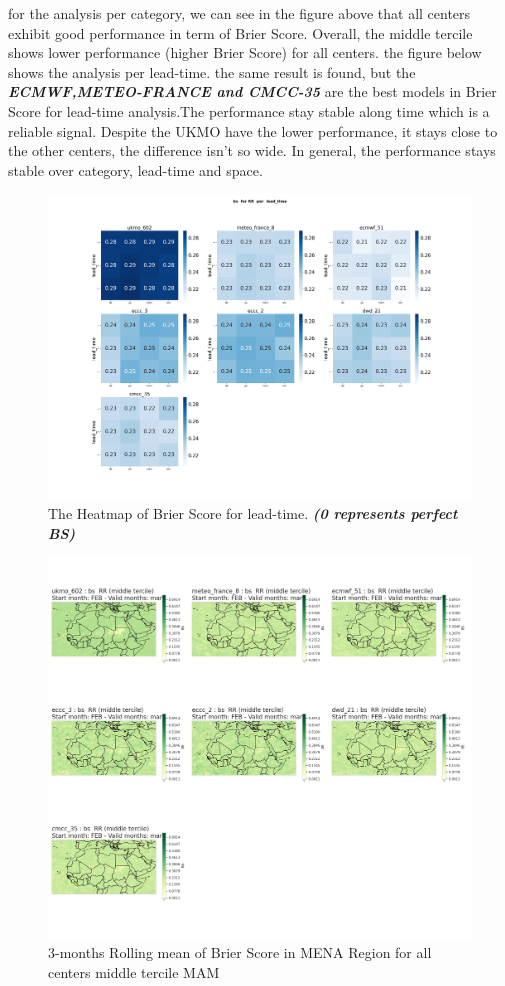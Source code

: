 for the analysis per category, we can see in the figure above that all centers exhibit good performance in term of Brier Score. Overall, the middle tercile shows lower performance (higher Brier Score) for all centers. 
the figure below shows the analysis per lead-time. the same result is found, but the \textbf{\textit{ECMWF,METEO-FRANCE and CMCC-35}} are the best models in Brier Score for lead-time analysis.The performance stay stable along time which is a reliable signal. Despite the UKMO have the lower performance, it stays close to the other centers, the difference isn't so wide. 
In general, the performance stays stable over category, lead-time and space.


\begin{figure}[H]
    \centering
    \includegraphics[scale=0.25]{plots/prob/bs/bs_RR_lead_time.png}
    \caption{The Heatmap of Brier Score for lead-time. \textbf{\textit{(0 represents perfect BS)}}}
\end{figure}


\begin{figure}[H]
\includegraphics[scale=0.3]{plots/prob/bs/bs_mam_RR_middle.png}
\caption{3-months Rolling mean of Brier Score in MENA Region for all centers middle tercile MAM}
\end{figure}

